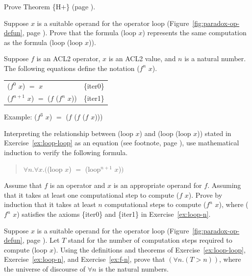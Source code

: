 \begin{ExerciseList}
\Exercise Prove Theorem \{H$+$\} (page \pageref{thm:HplusHminus}).

\Exercise \label{ex:loop-loop}
Suppose $x$ is a suitable operand for the operator loop
(Figure~\ref{fig:paradox-op-defun}, page \pageref{fig:paradox-op-defun}).
Prove that the formula
(loop $x$) represents
the same computation as the formula (loop (loop $x$)).

\Exercise \label{ex:loop-n}
Suppose $f$ is an ACL2 operator, $x$ is an ACL2 value,
and $n$ is a natural number.
The following equations define the notation ($f^n$ $x$).
\begin{center}
\begin{tabular}{ll}
($f^0$ $x$) $=$ $x$                    &\{iter0\} \\
($f^{n+1}$ $x$) $=$ ($f$ ($f^n$ $x$))  &\{iter1\} \\
\end{tabular}
Example: ($f^3$ $x$) $=$ ($f$ ($f$ ($f$ $x$)))
\end{center}
Interpreting the relationship between (loop $x$) and (loop (loop $x$))
stated in Exercise~\ref{ex:loop-loop}
as an equation (see footnote, page \pageref{caveat:equality-for-loop}),
use mathematical induction to verify the following formula.
\begin{quote}
$\forall n.\forall x.($(loop $x$) $=$ (loop$^{n+1}$ $x$)$)$
\end{quote}

\Exercise \label{ex:f-n}
Assume that $f$ is an operator and $x$ is an appropriate operand for $f$.
Assuming that it takes at least one computational step to compute ($f$ $x$).
Prove by induction that it takes at least $n$ computational steps
to compute ($f^n$ $x$), where ($f^n$ $x$) satisfies the axioms
\{iter0\} and \{iter1\} in Exercise~\ref{ex:loop-n}.

\Exercise
Suppose $x$ is a suitable operand for the operator loop
(Figure~\ref{fig:paradox-op-defun}, page \pageref{fig:paradox-op-defun}).
Let $T$ stand for the number of computation steps required to
compute (loop $x$).
Using the definitions and theorems of Exercise~\ref{ex:loop-loop},
Exercise~\ref{ex:loop-n}, and Exercise~\ref{ex:f-n},
prove that $(\forall n.(T > n))$, where the universe of 
discourse of $\forall n$ is the natural numbers.

\end{ExerciseList}

